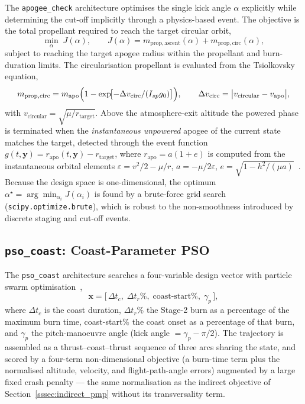The \texttt{apogee\_check} architecture optimises the single kick angle $\alpha$
explicitly while determining the cut-off implicitly through a physics-based event.
The objective is the total propellant required to reach the target circular orbit,
\begin{equation}
  \min_{\alpha}\; J(\alpha), \qquad
  J(\alpha)=m_{\mathrm{prop,ascent}}(\alpha)+m_{\mathrm{prop,circ}}(\alpha),
  \label{eq:apogee_objective}
\end{equation}
subject to reaching the target apogee radius within the propellant and
burn-duration limits. The circularisation propellant is evaluated from the
Tsiolkovsky equation,
\begin{equation}
  m_{\mathrm{prop,circ}} = m_{\mathrm{apo}}
    \Bigl(1 - \exp\!\bigl[-\Delta v_{\mathrm{circ}}/(I_{sp}g_0)\bigr]\Bigr),
  \qquad
  \Delta v_{\mathrm{circ}} = \bigl|v_{\mathrm{circular}}-v_{\mathrm{apo}}\bigr|,
  \label{eq:circ_dv}
\end{equation}
with $v_{\mathrm{circular}}=\sqrt{\mu/r_{\mathrm{target}}}$. Above the
atmosphere-exit altitude the powered phase is terminated when the
\emph{instantaneous unpowered} apogee of the current state matches the target,
detected through the event function
$g(t,\mathbf{y}) = r_{\mathrm{apo}}(t,\mathbf{y}) - r_{\mathrm{target}}$, where
$r_{\mathrm{apo}}=a(1+e)$ is computed from the instantaneous orbital elements
$\varepsilon=v^{2}/2-\mu/r$, $a=-\mu/2\varepsilon$,
$e=\sqrt{1-h^{2}/(\mu a)}$~\cite{curtis2020orbital}. Because the design space is
one-dimensional, the optimum $\alpha^{\star}=\arg\min_{\alpha_i}J(\alpha_i)$ is
found by a brute-force grid search (\texttt{scipy.optimize.brute}), which is
robust to the non-smoothness introduced by discrete staging and cut-off events.

\subsection{\texttt{pso\_coast}: Coast-Parameter PSO}
\label{ssec:pso_coast}

The \texttt{pso\_coast} architecture searches a four-variable design vector with
particle swarm optimisation~\cite{kennedy1995particle,biscani2020pagmo},
\begin{equation}
  \mathbf{x} = \bigl[\,\Delta t_c,\; \Delta t_{r}\%,\; \text{coast-start}\%,\;
                     \gamma_p\,\bigr],
  \label{eq:pso_coast_vector}
\end{equation}
where $\Delta t_c$ is the coast duration, $\Delta t_r\%$ the Stage-2 burn as a
percentage of the maximum burn time, coast-start$\%$ the coast onset as a
percentage of that burn, and $\gamma_p$ the pitch-manoeuvre angle
(kick angle $=\gamma_p-\pi/2$). The trajectory is assembled as a
thrust--coast--thrust sequence of three arcs sharing the state, and scored by a
four-term non-dimensional objective (a burn-time term plus the normalised
altitude, velocity, and flight-path-angle errors) augmented by a large fixed
crash penalty --- the same normalisation as the indirect objective of
Section~\ref{sssec:indirect_pmp} without its transversality term.

